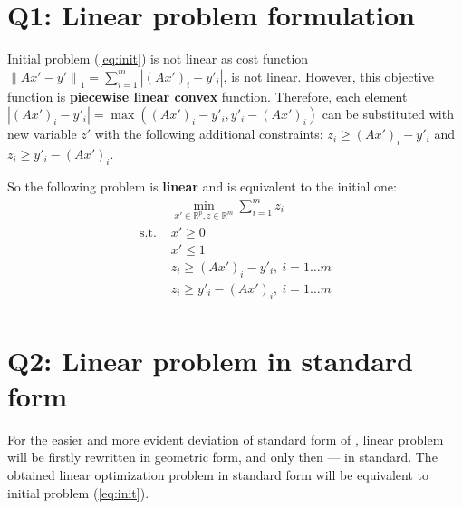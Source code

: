 \documentclass{article}
\def\R{\mathbb{R}}
\begin{document}
\section{Q1: Linear problem formulation}
Initial problem (\cref{eq:init}) is not linear as cost function
$ {\| Ax'-y' \|}_1 = \sum_{i=1}^{m} |{(Ax')}_i-y'_i|$, is not linear. However, this objective function is \textbf{piecewise linear convex} function. Therefore, each element $|{(Ax')}_i-y'_i| = \max({(Ax')}_i-y'_i, y'_i -{(Ax')}_i)$ can be substituted with new variable $z'$ with the following additional
constraints: $z_i \geq {(Ax')}_i-y'_i$ and $z_i \geq y'_i-{(Ax')}_i$.

So the following problem is \textbf{linear} and is equivalent to the initial one:
\begin{equation}\label{eq:linear}
  \begin{aligned}
                 & \min\limits_{x' \in \R^p, z \in \R^m} \sum_{i=1}^{m} z_i \\
    \text{s.t. } & x' \geq 0                                                \\
                 & x' \leq 1                                                \\
                 & z_i \geq {(Ax')}_i-y'_i, \ i = 1 \dots m                 \\
                 & z_i \geq y'_i-{(Ax')}_i, \ i = 1 \dots m                 \\
  \end{aligned}
\end{equation}

\section{Q2: Linear problem in standard form}

For the easier and more evident deviation of standard form of ,
linear problem will be firstly rewritten in geometric form, and only then --- in standard. The obtained linear optimization problem in standard form will be equivalent to initial problem (\cref{eq:init}).
\end{document}
